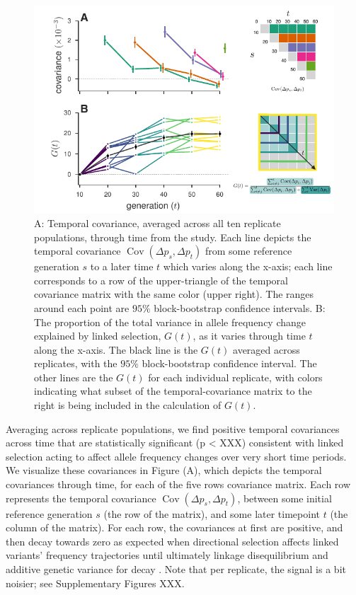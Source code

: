 \documentclass[11pt]{article}
\DeclareMathOperator{\cov}{Cov}
\begin{document}
\begin{figure}[!ht]
  \centering
  \includegraphics[width=\textwidth]{figures/figure-1.pdf}

  \caption{A: Temporal covariance, averaged across all ten replicate
    populations, through time from the \textcite{Barghi2019-qy} study. Each
    line depicts the temporal covariance $\cov(\Delta p_s, \Delta p_t)$ from
    some reference generation $s$ to a later time $t$ which varies along the
    x-axis; each line corresponds to a row of the upper-triangle of the
    temporal covariance matrix with the same color (upper right). The ranges
    around each point are $95\%$ block-bootstrap confidence intervals. B: The
    proportion of the total variance in allele frequency change explained by
    linked selection, $G(t)$, as it varies through time $t$ along the x-axis.
    The black line is the $G(t)$ averaged across replicates, with the $95\%$
    block-bootstrap confidence interval. The other lines are the $G(t)$ for
    each individual replicate, with colors indicating what subset of the
    temporal-covariance matrix to the right is being included in the
  calculation of $G(t)$.}

  \label{fig:figure-1}
\end{figure}


Averaging across replicate populations, we find positive temporal covariances
across time that are statistically significant (p < XXX) consistent with linked
selection acting to affect allele frequency changes over very short time
periods. We visualize these covariances in Figure \label{figure-1} (A), which
depicts the temporal covariances through time, for each of the five rows
covariance matrix.  Each row represents the temporal covariance $\cov(\Delta
p_s, \Delta p_t)$, between some initial reference generation $s$ (the row of
the matrix), and some later timepoint $t$ (the column of the matrix). For each
row, the covariances at first are positive, and then decay towards zero as
expected when directional selection affects linked variants' frequency
trajectories until ultimately linkage disequilibrium and additive genetic
variance for decay \parencite{Buffalo2019-io}. Note that per replicate, the
signal is a bit noisier; see Supplementary Figures XXX.
\end{document}
